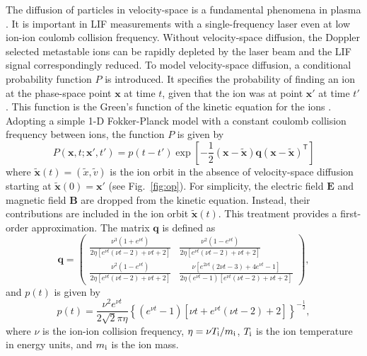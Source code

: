 \documentclass[aip,pop,reprint]{revtex4-1}
\begin{document}
The diffusion of particles in velocity-space is a fundamental phenomena in plasma \cite{skiff_plasma_1989, bowles_velocity_1992}. It is important in LIF measurements with a single-frequency laser even at low ion-ion coulomb collision frequency. Without velocity-space diffusion, the Doppler selected metastable ions can be rapidly depleted by the laser beam and the LIF signal correspondingly reduced. To model velocity-space diffusion, a conditional probability function $P$ is introduced. It specifies the probability of finding an ion at the phase-space point $\mathbf{x}$ at time $t$, given that the ion was at point $\mathbf{x'}$ at time $t'$. This function is the Green's function of the kinetic equation for the ions \cite{dougherty_model_1964, chandrasekhar_stochastic_1943}. Adopting a simple 1-D Fokker-Planck model with a constant coulomb collision frequency between ions, the function $P$ is given by
\begin{equation}
\label{eq:P}
P (\mathbf{x},t;\mathbf{x'},t')=p(t-t')\exp \left[-\frac{1}{2}\left ( \mathbf{x}-\mathbf{\tilde{x}} \right ) \mathbf{q} \left(\mathbf{x}-\mathbf{\tilde{x}}\right)^{\mathsf{T}} \right]
\end{equation}
where $\mathbf{\tilde{x}}(t)=(\tilde{x},\tilde{v})$ is the ion orbit in the absence of velocity-space diffusion starting at $\mathbf{\tilde{x}}(0)=\mathbf{x'}$ (see Fig.~\ref{fig:op}). For simplicity, the electric field $\mathbf{E}$ and magnetic field $\mathbf{B}$ are dropped from the kinetic equation. Instead, their contributions are included in the ion orbit $\mathbf{\tilde{x}}(t)$. This treatment provides a first-order approximation. The matrix $\mathbf{q}$ is defined as
\begin{equation}
\label{eq:q}
\mathbf{q}=\begin{pmatrix}
\frac{\nu ^3\left (1+e^{\nu t} \right )}{2\eta \left [ e^{\nu t}(\nu t-2)+\nu t+2 \right ]} &
\frac{\nu ^2\left (1-e^{\nu t} \right )}{2\eta \left [ e^{\nu t}(\nu t-2)+\nu t+2 \right ]} \\[14pt]
\frac{\nu ^2\left (1-e^{\nu t} \right )}{2\eta \left [ e^{\nu t}(\nu t-2)+\nu t+2 \right ]} & 
\frac{\nu \left [ e^{2\nu t}(2\nu t-3)+4e^{\nu t}-1 \right ]}{2\eta \left(e^{\nu t}-1 \right) \left [ e^{\nu t}(\nu t-2)+\nu t+2 \right ]} \nonumber
\end{pmatrix},
\end{equation}
and $p(t)$ is given by
\begin{equation}
\label{eq:p(t)}
p(t)=\frac{\nu ^2 e^{\nu t}}{2 \sqrt{2} \pi \eta }\left \{\left ( e^{\nu t}-1 \right )\left [ \nu t+e^{\nu t}(\nu t-2)+2 \right ] \right \}^{-\frac{1}{2}} \nonumber,
\end{equation}
where $\nu$ is the ion-ion collision frequency, $\eta=\nu T_\textup{i}/m_\textup{i}$, $T_\textup{i}$ is the ion temperature in energy units, and $m_\textup{i}$ is the ion mass. 
\end{document}
